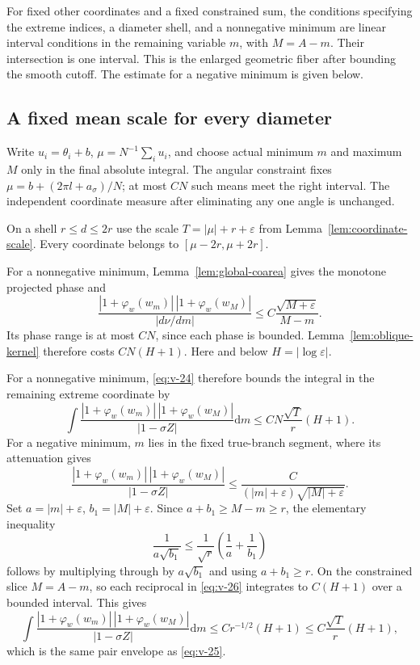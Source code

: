 \documentclass[11pt]{article}
\numberwithin{equation}{section}
\theoremstyle{remark}\newtheorem{remark}[theorem]{Remark}
\newcommand{\dd}{\mathrm d}
\begin{document}
For fixed other coordinates and a fixed constrained sum,
the conditions specifying the extreme indices, a diameter
shell, and a nonnegative minimum are linear interval conditions
in the remaining variable $m$, with $M=A-m$.
Their intersection is one interval. This is the enlarged geometric
fiber after bounding the smooth cutoff. The estimate for a negative
minimum is given below.

\subsection{A fixed mean scale for every diameter}


Write $u_i=\theta_i+b$, $\mu=N^{-1}\sum_i u_i$, and choose actual
minimum $m$ and maximum $M$ only in the final absolute integral.
The angular constraint fixes $\mu=b+(2\pi l+a_\sigma)/N$; at most $CN$ such means
meet the right interval. The independent coordinate measure after
eliminating any one angle is unchanged.

On a shell $r\le d\le2r$ use the scale
$T=|\mu|+r+\varepsilon$ from Lemma~\ref{lem:coordinate-scale}.
Every coordinate belongs to $[\mu-2r,\mu+2r]$.

For a nonnegative minimum, Lemma~\ref{lem:global-coarea}
gives the monotone projected phase and
\begin{equation}\label{eq:v-24}
 \frac{|1+\varphi_w(w_m)|\,|1+\varphi_w(w_M)|}
 {|d\nu/dm|}\le C\frac{\sqrt{M+\varepsilon}}{M-m}.
\end{equation}
Its phase range is at most $CN$, since each phase is bounded.
Lemma~\ref{lem:oblique-kernel} therefore costs $CN(H+1)$.
Here and below $H=|\log\varepsilon|$.

For a nonnegative minimum, \eqref{eq:v-24} therefore bounds the integral in
the remaining extreme coordinate by
\begin{equation}\label{eq:v-25}
\int \frac{|1+\varphi_w(w_m)|\,|1+\varphi_w(w_M)|}{|1-\sigma Z|}\dd m
       \le CN\frac{\sqrt T}{r}(H+1).
\end{equation}
For a negative minimum, $m$ lies in the fixed true-branch segment,
where its attenuation gives
\[
 \frac{|1+\varphi_w(w_m)|\,|1+\varphi_w(w_M)|}{|1-\sigma Z|}
 \le \frac{C}{(|m|+\varepsilon)\sqrt{|M|+\varepsilon}}.
\]
Set $a=|m|+\varepsilon$, $b_1=|M|+\varepsilon$. Since
$a+b_1\ge M-m\ge r$, the elementary inequality
\begin{equation}\label{eq:v-26}
\frac1{a\sqrt{b_1}}
 \le \frac1{\sqrt r}\left(\frac1a+\frac1{b_1}\right)
\end{equation}
follows by multiplying through by $a\sqrt{b_1}$ and using
$a+b_1\ge r$. On the constrained slice $M=A-m$, so each reciprocal
in \eqref{eq:v-26} integrates to $C(H+1)$ over a bounded interval. This gives
\begin{equation}\label{eq:v-27}
\int \frac{|1+\varphi_w(w_m)|\,|1+\varphi_w(w_M)|}{|1-\sigma Z|}\dd m
 \le Cr^{-1/2}(H+1)\le C\frac{\sqrt T}{r}(H+1),
\end{equation}
which is the same pair envelope as \eqref{eq:v-25}. 
\end{document}

